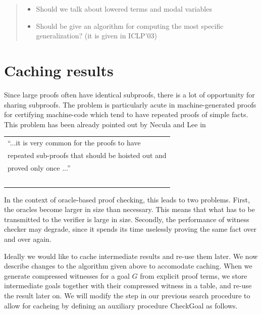 \documentclass{acmconf}
\newenvironment{note}{\begin{quote}\message{note!}\it}{\end{quote}}
\begin{document}
\begin{note}
  \begin{itemize}
  \item Should we talk about lowered terms and modal variables
  \item Should be give an algorithm for computing the most specific
    generalization? (it is given in ICLP'03)
  \end{itemize}
\end{note}


\section{Caching results}
\label{sec:tabling}
Since large proofs often have identical subproofs,  there is a
lot of opportunity for sharing subproofs. The problem is particularly
acute in machine-generated proofs for certifying machine-code which
tend to have repeated proofs of simple facts. This problem has been
already pointed out by Necula and Lee in \cite{NeculaLee+97:resource}

 \begin{tabular}[h]{l}
``...it is very common for the proofs to have  \\
repeated sub-proofs that should be hoisted out and \\
proved only once ...'' \cite{NeculaLee+97:resource}\\ $\;$
 \end{tabular}


In the context of oracle-based proof checking, this leads to two
problems.  First, the oracles become larger in size than
necessary. This means that what has to be transmitted to the verifier
is large in size. Secondly, the performance of witness checker may
degrade, since it spends its time uselessly proving the same fact over
and over again. 

Ideally we would like to cache intermediate results and re-use them
later. We now describe changes to the algorithm given above to
accomodate caching. When we generate compressed witnesses for a goal
$G$ from explicit proof terms, we store intermediate goals together
with their compressed witness in a table, and re-use the result later
on.  We will modify the {} step in our previous search
procedure to allow for cacheing by defining an auxiliary procedure
{\sf CheckGoal} as follows.
\end{document}

